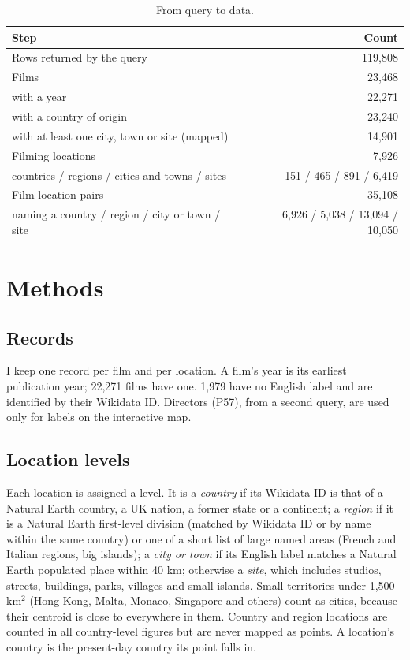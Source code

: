 \documentclass[11pt,a4paper]{article}
\begin{document}
\begin{table}[tbp]\centering\small\caption{From query to data.}\label{tab:pipe}\begin{tabular}{p{9.8cm}r}\toprule Step & Count\\\midrule
Rows returned by the query & 119,808\\
Films & 23,468\\
\quad with a year & 22,271\\
\quad with a country of origin & 23,240\\
\quad with at least one city, town or site (mapped) & 14,901\\
Filming locations & 7,926\\
\quad countries / regions / cities and towns / sites & 151 / 465 / 891 / 6,419\\
Film-location pairs & 35,108\\
\quad naming a country / region / city or town / site & 6,926 / 5,038 / 13,094 / 10,050\\
\bottomrule\end{tabular}\end{table}

\section{Methods}
\subsection{Records}
I keep one record per film and per location. A film's year is its earliest publication year; 22,271 films have one. 1,979 have no English label and are identified by their Wikidata ID. Directors (P57), from a second query, are used only for labels on the interactive map.

\subsection{Location levels}
Each location is assigned a level. It is a \emph{country} if its Wikidata ID is that of a Natural Earth country, a UK nation, a former state or a continent; a \emph{region} if it is a Natural Earth first-level division (matched by Wikidata ID or by name within the same country) or one of a short list of large named areas (French and Italian regions, big islands); a \emph{city or town} if its English label matches a Natural Earth populated place within 40 km; otherwise a \emph{site}, which includes studios, streets, buildings, parks, villages and small islands. Small territories under 1,500 km$^2$ (Hong Kong, Malta, Monaco, Singapore and others) count as cities, because their centroid is close to everywhere in them. Country and region locations are counted in all country-level figures but are never mapped as points. A location's country is the present-day country its point falls in.
\end{document}
